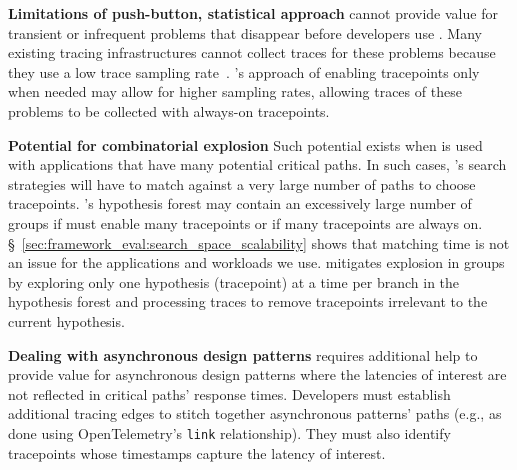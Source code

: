\noindent\textbf{Limitations of push-button, statistical approach}
\STAIF{} cannot provide value for transient or infrequent problems that disappear before developers use \STAIF{}.  Many existing tracing
infrastructures cannot collect traces for these problems because they
use a low trace sampling rate~\cite{Sambasivan:2016bo}.  \STAIF{}'s
approach of enabling tracepoints only when needed may allow for higher
sampling rates, allowing traces of these problems to be collected with
always-on tracepoints.

\noindent\textbf{Potential for combinatorial explosion} Such potential exists
when \STAIF{} is used with applications that have many potential
critical paths.  In such cases, \STAIF{}'s search strategies will have
to match against a very large number of paths to choose tracepoints.
\STAIF{}'s hypothesis forest may contain an excessively large
number of groups if \STAIF{} must enable many tracepoints or if many
tracepoints are always
on. \S~\ref{sec:framework_eval:search_space_scalability} shows that
matching time is not an issue for the applications and workloads we
use.  \STAIF{} mitigates explosion in groups by exploring only one
hypothesis (tracepoint) at a time per branch in the hypothesis forest
and processing traces to remove tracepoints irrelevant to the current
hypothesis.


\noindent\textbf{Dealing with asynchronous design patterns} \STAIF{}
requires additional help to provide value for asynchronous design
patterns where the latencies of interest are not reflected in critical
paths' response times.  Developers must establish additional tracing
edges to stitch together asynchronous patterns' paths (e.g., as done
using OpenTelemetry's \texttt{link} relationship). 
 They must also identify tracepoints whose timestamps capture the latency of interest.
